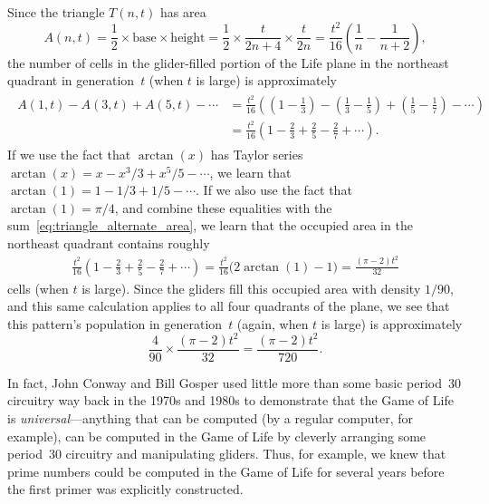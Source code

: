 \begin{itemize}
	Since the triangle $T(n,t)$ has area
	\[
		A(n,t) = \frac{1}{2} \times \text{base} \times \text{height} = \frac{1}{2} \times \frac{t}{2n + 4} \times \frac{t}{2n} = \frac{t^2}{16} \left(\frac{1}{n} - \frac{1}{n+2}\right),
	\]
	the number of cells in the glider-filled portion of the Life plane in the northeast quadrant in generation~$t$ (when $t$ is large) is approximately
	\begin{align}\begin{split}\label{eq:triangle_alternate_area}
		A(1,t) - A(3,t) + A(5,t) - \cdots & = \frac{t^2}{16} \left( \left(1 - \frac{1}{3}\right) - \left(\frac{1}{3} - \frac{1}{5}\right) + \left(\frac{1}{5} - \frac{1}{7}\right) - \cdots\right) \\
		& = \frac{t^2}{16} \left( 1 - \frac{2}{3} + \frac{2}{5} - \frac{2}{7} + \cdots\right).
	\end{split}\end{align}
	If we use the fact that $\arctan(x)$ has Taylor series $\arctan(x) = x - x^3/3 + x^5/5 - \cdots$, we learn that $\arctan(1) = 1 - 1/3 + 1/5 - \cdots$. If we also use the fact that $\arctan(1) = \pi/4$, and combine these equalities with the sum~\eqref{eq:triangle_alternate_area}, we learn that the occupied area in the northeast quadrant contains roughly
	\begin{align*}
		\frac{t^2}{16} \left( 1 - \frac{2}{3} + \frac{2}{5} - \frac{2}{7} + \cdots\right) = \frac{t^2}{16}\big( 2\arctan(1) - 1\big) = \frac{(\pi-2)t^2}{32}
	\end{align*}
	cells (when $t$ is large). Since the gliders fill this occupied area with density $1/90$, and this same calculation applies to all four quadrants of the plane, we see that this pattern's population in generation~$t$ (again, when $t$ is large) is approximately
	\[
		\frac{4}{90} \times \frac{(\pi-2)t^2}{32} = \frac{(\pi-2)t^2}{720}.
	\]
\end{itemize}

In fact, John Conway and Bill Gosper used little more than some basic period~$30$ circuitry way back in the 1970s and 1980s \cite[Chapter~25]{BCG82} to demonstrate that the Game of Life is \emph{universal}---anything that can be computed (by a regular computer, for example), can be computed in the Game of Life by cleverly arranging some period~$30$ circuitry and manipulating gliders. Thus, for example, we knew that prime numbers could be computed in the Game of Life for several years before the first primer was explicitly constructed.

